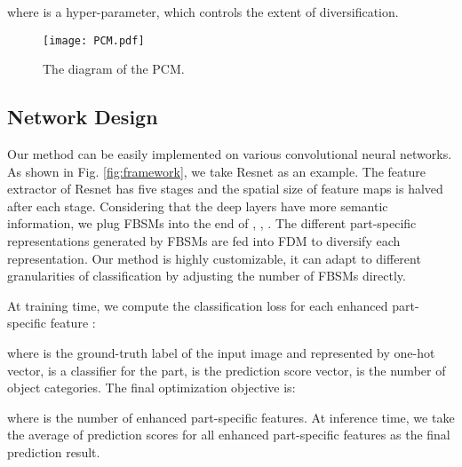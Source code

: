 \documentclass[conference]{IEEEtran}
\begin{document}
	where  is a hyper-parameter, which controls the extent of diversification.
	\begin{figure}
		\texttt{[image: PCM.pdf]}
		\caption{The diagram of the PCM.}
		\label{fig:PCM}
	\end{figure}
	\subsection{Network Design}
	Our method can be easily implemented on various convolutional neural networks. 
	As shown in Fig. \ref{fig:framework}, we take Resnet\cite{ResNet} as an example.
	The feature extractor of Resnet has five stages and the spatial size of feature maps is halved after each stage. Considering that the deep layers have more semantic information, we plug FBSMs into the end of , , . 
	The different part-specific representations generated by FBSMs are fed into FDM to diversify each representation. Our method is highly customizable, it can adapt to different granularities of classification by adjusting the number of FBSMs directly.
	
	At training time, we compute the classification loss for each enhanced part-specific feature :
	
	where  is the ground-truth label of the input image and represented by one-hot vector,  is a classifier for the  part,  is the prediction score vector,  is the number of object categories.
	The final optimization objective is:
	
	where  is the number of enhanced part-specific features. 
	At inference time, we take the average of prediction scores for all enhanced part-specific features as the final prediction result.
\end{document}
